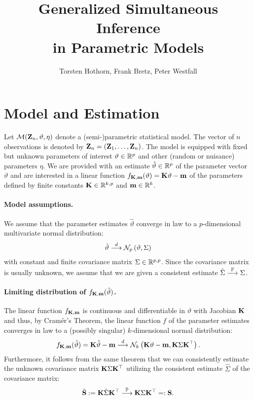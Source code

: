 \documentclass[12pt]{article}
\title{Generalized Simultaneous Inference \\ in Parametric Models}
\author{Torsten Hothorn, Frank Bretz, Peter Westfall}
\begin{document}
\maketitle

\section{Model and Estimation}

Let $\mathcal{M}(\mathbf{Z}_n, \vartheta, \eta)$ denote a (semi-)parametric statistical model.
The vector of $n$ observations is denoted by $\mathbf{Z}_n = (\mathbf{Z}_1, \dots, \mathbf{Z}_n)$. 
The model is equipped with fixed
but unknown parameters of interest $\vartheta \in \mathbb{R}^p$ 
and other (random or nuisance) parameters $\eta$. We are provided 
with an estimate $\hat{\vartheta} \in \mathbb{R}^p$ of the parameter 
vector $\vartheta$ and are interested in a linear
function $f_{\mathbf{K}, \mathbf{m}}(\vartheta) = \mathbf{K} \vartheta - \mathbf{m}$
of the parameters defined by finite constants $\mathbf{K} \in \mathbb{R}^{k, p}$
and $\mathbf{m} \in \mathbb{R}^k$.

\paragraph{Model assumptions.}

We assume that the parameter estimates $\hat{\vartheta}$ converge in law
to a $p$-dimensional multivariate normal distribution:
\begin{eqnarray} \label{normality}
\hat{\vartheta} \stackrel{d}{\longrightarrow} \mathcal{N}_p\left(\vartheta, \Sigma\right)
\end{eqnarray}
with constant and finite covariance matrix $\Sigma \in \mathbb{R}^{p,p}$.
Since the covariance matrix is usually unknown, we assume 
that we are given a consistent estimate $\hat{\Sigma} \stackrel{\mathbb{P}}{\longrightarrow} \Sigma$.

\paragraph{Limiting distribution of $f_{\mathbf{K},\mathbf{m}}(\hat{\vartheta})$.}

The linear function $f_{\mathbf{K}, \mathbf{m}}$ is continuous and differentiable in
$\vartheta$ with Jacobian $\mathbf{K}$ and thus, by Cram{\'e}r's Theorem, 
the linear function $f$ of the parameter estimates
converges in law to a (possibly singular) $k$-dimensional normal distribution:
\begin{eqnarray} \label{dist_f}
f_{\mathbf{K}, \mathbf{m}}(\hat{\vartheta}) = \mathbf{K} \hat{\vartheta} - \mathbf{m} 
\stackrel{d}{\longrightarrow} \mathcal{N}_k\left(\mathbf{K} \vartheta - \mathbf{m}, \mathbf{K} \Sigma \mathbf{K}^\top\right).
\end{eqnarray}
Furthermore, it follows from the same theorem that we can 
consistently estimate the unknown covariance matrix $\mathbf{K} \Sigma \mathbf{K}^\top$ utilizing
the consistent estimate $\hat{\Sigma}$ of the covariance matrix:
\begin{eqnarray*}
\hat{\mathbf{S}} := \mathbf{K} \hat{\Sigma} \mathbf{K}^\top \stackrel{\mathbb{P}}{\longrightarrow} \mathbf{K} \Sigma \mathbf{K}^\top =: \mathbf{S}.
\end{eqnarray*}
\end{document}
